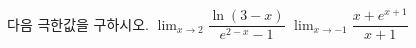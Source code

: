 다음 극한값을 구하시오.
 $\displaystyle\lim_{x\to 2}\dfrac{\ln(3-x)}{e^{2-x}-1}$
 $\displaystyle\lim_{x\to -1}\dfrac{x+e^{x+1}}{x+1}$
